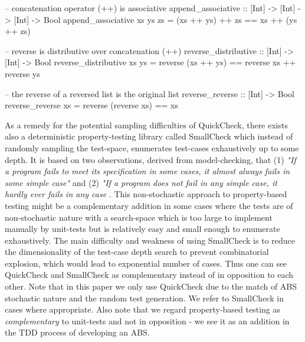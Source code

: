 \begin{HaskellCode}
-- concatenation operator (++) is associative
append_associative :: [Int] -> [Int] -> [Int] -> Bool
append_associative xs ys zs = (xs ++ ys) ++ zs == xs ++ (ys ++ zs)

-- reverse is distributive over concatenation (++)
reverse_distributive :: [Int] -> [Int] -> Bool
reverse_distributive xs ys = reverse (xs ++ ys) == reverse xs ++ reverse ys

-- the reverse of a reversed list is the original list
reverse_reverse :: [Int] -> Bool
reverse_reverse xs = reverse (reverse xs) == xs
\end{HaskellCode}

As a remedy for the potential sampling difficulties of QuickCheck, there exists also a deterministic property-testing library called SmallCheck \cite{runciman_smallcheck_2008} which instead of randomly sampling the test-space, enumerates test-cases exhaustively up to some depth. It is based on two observations, derived from model-checking, that (1) \textit{"If a program fails to meet its specification in some cases, it almost always fails in some simple case"} and (2) \textit{"If a program does not fail in any simple case, it hardly ever fails in any case} \cite{runciman_smallcheck_2008}. This non-stochastic approach to property-based testing might be a complementary addition in some cases where the tests are of non-stochastic nature with a search-space which is too large to implement manually by unit-tests but is relatively easy and small enough to enumerate exhaustively. The main difficulty and weakness of using SmallCheck is to reduce the dimensionality of the test-case depth search to prevent combinatorial explosion, which would lead to exponential number of cases. Thus one can see QuickCheck and SmallCheck as complementary instead of in opposition to each other.
Note that in this paper we only use QuickCheck due to the match of ABS stochastic nature and the random test generation. We refer to SmallCheck in cases where appropriate. Also note that we regard property-based testing as \textit{complementary} to unit-tests and not in opposition - we see it as an addition in the TDD process of developing an ABS.